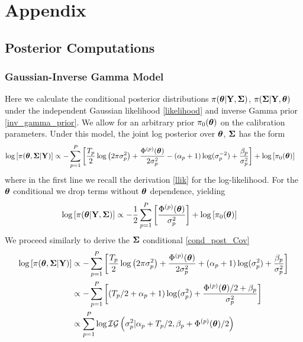 \documentclass[12pt]{article}
\begin{document}
\section{Appendix}

\subsection{Posterior Computations}

\subsubsection{Gaussian-Inverse Gamma Model}
Here we calculate the conditional posterior distributions $\pi(\boldsymbol{\theta}|\mathbf{Y}, \boldsymbol{\Sigma})$, $\pi(\boldsymbol{\Sigma}|\mathbf{Y}, \boldsymbol{\theta})$ under the independent Gaussian 
likelihood \ref{likelihood} and inverse Gamma prior \ref{inv_gamma_prior}. We allow for an arbitrary prior $\pi_0(\boldsymbol{\theta})$ on the calibration parameters.
Under this model, the joint log posterior over $\boldsymbol{\theta}$, $\boldsymbol{\Sigma}$ has the form 
\begin{align*}
\log\left[\pi(\boldsymbol{\theta}, \boldsymbol{\Sigma}|\mathbf{Y})\right] &\propto -\sum_{p = 1}^{P} \left[\frac{T_{p}}{2} \log\left(2\pi \sigma_{p}^2 \right) + \frac{\Phi^{(p)}(\boldsymbol{\theta})}{2\sigma_{p}^2}  - (\alpha_{p} + 1)\log(\sigma_{p}^{-2}) + \frac{\beta_{p}}{\sigma_{p}^2} \right] + \log\left[\pi_0(\boldsymbol{\theta})\right] 
\end{align*}
where in the first line we recall the derivation \ref{llik} for the log-likelihood. For the $\boldsymbol{\theta}$ conditional we drop terms without $\boldsymbol{\theta}$ dependence, yielding
\begin{align*}
\log\left[\pi(\boldsymbol{\theta}|\mathbf{Y}, \boldsymbol{\Sigma})\right] &\propto -\frac{1}{2} \sum_{p = 1}^{P} \left[\frac{\Phi^{(p)}(\boldsymbol{\theta})}{\sigma_{p}^2}\right]  + \log\left[\pi_0(\boldsymbol{\theta})\right] 
\end{align*}
We proceed similarly to derive the $\boldsymbol{\Sigma}$ conditional \ref{cond_post_Cov}
\begin{align*}
\log\left[\pi(\boldsymbol{\theta}, \boldsymbol{\Sigma}|\mathbf{Y})\right] &\propto - \sum_{p = 1}^{P} \left[\frac{T_{p}}{2} \log\left(2\pi \sigma_{p}^2 \right) + \frac{\Phi^{(p)}(\boldsymbol{\theta})}{2\sigma_{p}^2}  + (\alpha_{p} + 1)\log(\sigma_{p}^{2}) + \frac{\beta_{p}}{\sigma_{p}^2} \right] \\
&\propto - \sum_{p = 1}^{P} \left[(T_{p}/2 + \alpha_{p} + 1)\log(\sigma_{p}^2) + \frac{\Phi^{(p)}(\boldsymbol{\theta})/2 + \beta_{p}}{\sigma_{p}^2} \right] \\
&\propto \sum_{p = 1}^{P} \log \mathcal{IG}\left(\sigma_{p}^2|\alpha_{p} + T_{p}/2, \beta_{p} + \Phi^{(p)}(\boldsymbol{\theta})/2 \right)
\end{align*}
\end{document}
